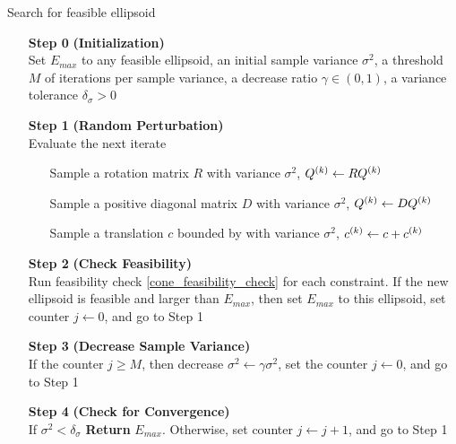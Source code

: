 \begin{algorithm}[H]
    \caption{Search for feasible ellipsoid}
    \label{numerical_ellipsoid_algorithm}
    \begin{itemize}
        \item[\textbf{Step 0}] \textbf{(Initialization)} \\
                Set $E_{max}$ to any feasible ellipsoid, 
                an initial sample variance $\sigma^2$, 
                a threshold $M$ of iterations per sample variance, 
                a decrease ratio $\gamma \in (0, 1)$, 
                a variance tolerance $\delta_{\sigma} > 0$
        
        \item[\textbf{Step 1}] \textbf{(Random Perturbation)} \\
            Evaluate the next iterate \begin{itemize}
                \item[] Sample a rotation matrix $R$ with variance $\sigma^2$, ${Q^{(k)}} \gets R {Q^{(k)}}$
                \item[] Sample a positive diagonal matrix $D$ with variance $\sigma^2$, ${Q^{(k)}} \gets D {Q^{(k)}}$
                \item[] Sample a translation $c$ bounded by with variance $\sigma^2$, $c^{(k)} \gets c + c^{(k)}$
            \end{itemize}
        
        \item[\textbf{Step 2}] \textbf{(Check Feasibility)} \\
            Run feasibility check \cref{cone_feasibility_check} for each constraint.
            If the new ellipsoid is feasible and larger than $E_{max}$, then 
            	set $E_{max}$ to this ellipsoid,
            	set counter $j \gets 0$, and
            	go to Step 1
        
        \item[\textbf{Step 3}] \textbf{(Decrease Sample Variance)} \\
            If the counter $j \ge M$, then
	    	decrease $\sigma^2 \gets \gamma \sigma^2$,
	    	set the counter $j\gets 0$, and
	    	go to Step 1
            
        \item[\textbf{Step 4}] \textbf{(Check for Convergence)} \\
	    If $\sigma^2 < \delta_{\sigma}$ \textbf{Return} $E_{max}$.
	    Otherwise, 
        		set counter $j \gets j + 1$, and
        		go to Step 1
    \end{itemize}
\end{algorithm}

